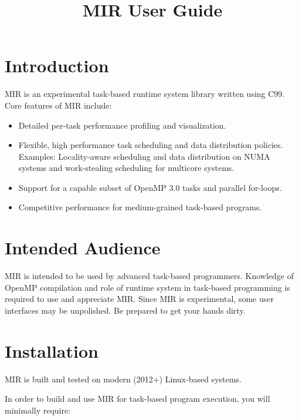 \documentclass[11pt,a4paper]{article}
\title{MIR User Guide}
\begin{document}
\maketitle

\section{Introduction}\label{introduction}

MIR is an experimental task-based runtime system library written using C99. Core features of MIR include:

\begin{itemize}
    \item Detailed per-task performance profiling and visualization.
    \item Flexible, high performance task scheduling and data distribution policies. Examples: Locality-aware scheduling and data distribution on NUMA systems and work-stealing scheduling for multicore systems.
    \item Support for a capable subset of OpenMP 3.0 tasks and parallel for-loops.
    \item Competitive performance for medium-grained task-based programs.
\end{itemize}

\section{Intended Audience}\label{intended-audience}

MIR is intended to be used by advanced task-based programmers. Knowledge of OpenMP compilation and role of runtime system in task-based programming is required to use and appreciate MIR. Since MIR is experimental, some user interfaces may be unpolished. Be prepared to get your hands dirty.

\section{Installation}\label{installation}

MIR is built and tested on modern (2012+) Linux-based systems.

In order to build and use MIR for task-based program execution, you will minimally require:
\end{document}
